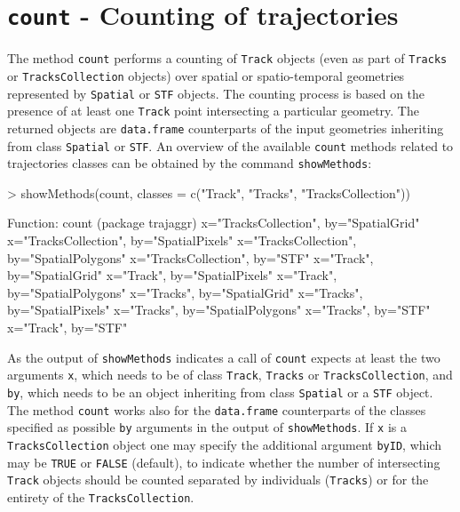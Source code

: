 \documentclass[12pt, oneside, a4paper]{scrbook}
\newcommand{\pkg}[1]{{\normalfont\fontseries{b}\selectfont #1}}
\let\code=\texttt
\newcommand{\codeintitles}[1]{{\tt #1}} %
\begin{document}
\section{\codeintitles{count} - Counting of trajectories}
\label{sec:count}

The method \code{count} performs a counting of \code{Track} objects (even as part of \code{Tracks} or \code{TracksCollection} objects) over spatial or spatio-temporal geometries represented by \code{Spatial} or \code{STF} objects. The counting process is based on the presence of at least one \code{Track} point intersecting a particular geometry. The returned objects are \code{data.frame} counterparts of the input geometries inheriting from class \code{Spatial} or \code{STF}. An overview of the available \code{count} methods related to \pkg{trajectories} classes can be obtained by the command \code{showMethods}:

\par\medskip

\begin{small}
\begin{Schunk}
\begin{Sinput}
> showMethods(count, classes = c("Track", "Tracks", "TracksCollection"))
\end{Sinput}
\begin{Soutput}
Function: count (package trajaggr)
x="TracksCollection", by="SpatialGrid"
x="TracksCollection", by="SpatialPixels"
x="TracksCollection", by="SpatialPolygons"
x="TracksCollection", by="STF"
x="Track", by="SpatialGrid"
x="Track", by="SpatialPixels"
x="Track", by="SpatialPolygons"
x="Tracks", by="SpatialGrid"
x="Tracks", by="SpatialPixels"
x="Tracks", by="SpatialPolygons"
x="Tracks", by="STF"
x="Track", by="STF"
\end{Soutput}
\end{Schunk}
\end{small}

\par\medskip

As the output of \code{showMethods} indicates a call of \code{count} expects at least the two arguments \code{x}, which needs to be of class \code{Track}, \code{Tracks} or \code{TracksCollection}, and \code{by}, which needs to be an object inheriting from class \code{Spatial} or a \code{STF} object. The method \code{count} works also for the \code{data.frame} counterparts of the classes specified as possible \code{by} arguments in the output of \code{showMethods}. If \code{x} is a \code{TracksCollection} object one may specify the additional argument \code{byID}, which may be \code{TRUE} or \code{FALSE} (default), to indicate whether the number of intersecting \code{Track} objects should be counted separated by individuals (\code{Tracks}) or for the entirety of the \code{TracksCollection}.
\end{document}
